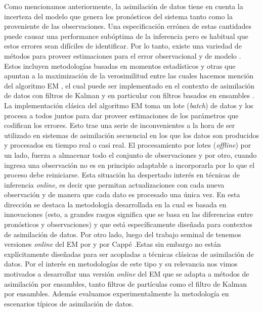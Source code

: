 Como mencionamos anteriormente, la asimilación de datos tiene en cuenta la incerteza del modelo que genera los pronósticos del sistema tanto como la proveniente de las observaciones. Una especificación errónea de estas cantidades puede causar una performance subóptima de la inferencia pero es habitual que estos errores sean difíciles de identificar. Por lo tanto, existe una variedad de métodos para proveer estimaciones para el error observacional y de modelo \citep{Tandeo2020}. Estos incluyen metodologías basadas en momentos estadísticos y otras que apuntan a la maximización de la verosimilitud entre las cuales hacemos mención del algoritmo EM \citep{Dempster1977}, el cual puede ser implementado en el contexto de asimilación de datos con filtros de Kalman y en particular con filtros basados en ensambles \citep{Tandeo2015}. La implementación clásica del algoritmo EM toma un lote (\textit{batch}) de datos y los procesa a todos juntos para dar proveer estimaciones de los parámetros que codifican los errores. Esto trae una serie de inconvenientes a la hora de ser utilizado en sistemas de asimilación secuencial en los que los datos son producidos y procesados en tiempo real o casi real. El procesamiento por lotes (\textit{offline}) por un lado, fuerza a almacenar todo el conjunto de observaciones y por otro, cuando ingresa una observación no es en principio adaptable a incorporarla por lo que el proceso debe reiniciarse. Esta situación ha despertado interés en técnicas de inferencia \textit{online}, es decir que permitan actualizaciones con cada nueva observación y de manera que cada dato es procesado una única vez. En esta dirección se destaca la metodología desarrollada en \cite{Berry2013} la cual es basada en innovaciones (esto, a grandes rasgos significa que se basa en las diferencias entre pronósticos y observaciones) y que está específicamente diseñada para contextos de asimilación de datos. Por otro lado, luego del trabajo seminal de \cite{Neal1998} tenemos versiones \textit{online} del EM por \cite{Andrieu2003} y por Cappé \citep{Cappe2009,Cappe2011}.Estas sin embargo no están explícitamente diseñadas para ser acopladas a técnicas clásicas de asimilación de datos. Por el interés en metodologías de este tipo y su relevancia nos vimos motivados a desarrollar una versión \textit{online} del EM que se adapta a métodos de asimilación por ensambles, tanto filtros de partículas como el filtro de Kalman por ensambles. Además evaluamos experimentalmente la metodología en escenarios típicos de asimilación de datos.

